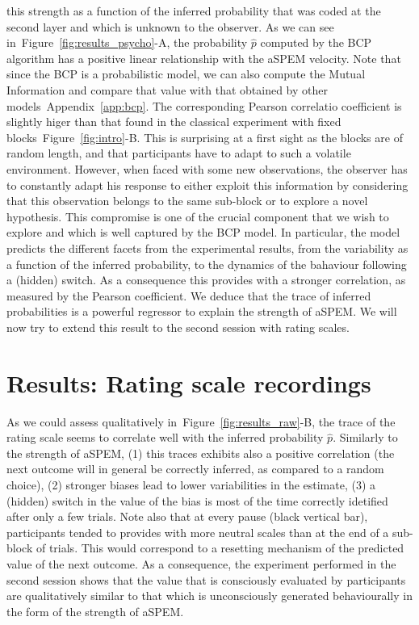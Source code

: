 \documentclass[profile,final,english,draft]{article}%
\newcommand{\seeFig}[1]{Figure~\ref{fig:#1}}
\newcommand{\seeApp}[1]{Appendix~\ref{app:#1}}
\begin{document}
this strength as a function of the inferred probability
that was coded at the second layer and which is unknown to the observer.
As we can see in~\seeFig{results_psycho}-A,
the probability $\hat{p}$ computed by the BCP algorithm
has a positive linear relationship with the aSPEM velocity.
Note that since the BCP is a probabilistic model,
we can also compute the Mutual Information and
compare that value with that obtained by other models~\seeApp{bcp}.
The corresponding Pearson correlatio coefficient
is slightly higer than that found in
the classical experiment with fixed blocks~\seeFig{intro}-B.
This is surprising at a first sight as the blocks are of random length,
and that participants have to adapt to such a volatile environment.
However, when faced with some new observations,
the observer has to constantly adapt his response
to either exploit this information by considering that
this observation belongs to the same sub-block or to explore
a novel hypothesis.
This compromise is one of the crucial component that we wish to explore
and which is well captured by the BCP model.
In particular, the model predicts the different facets
from the experimental results,
from the variability as a function of the inferred probability,
to the dynamics of the bahaviour following a (hidden) switch.
As a consequence this provides with a stronger correlation,
as measured by the Pearson coefficient.
We deduce that the trace of inferred probabilities is a powerful regressor
to explain the strength of aSPEM.
We will now try to extend this result
to the second session with rating scales.
\section{Results: Rating scale recordings}
\label{sec:rating_scale}
As we could assess qualitatively in~\seeFig{results_raw}-B,
the trace of the rating scale seems to correlate well
with the inferred probability $\hat{p}$.
Similarly to the strength of aSPEM,
(1) this traces exhibits also a positive correlation
(the next outcome will in general be correctly inferred,
as compared to a random choice),
(2) stronger biases lead to lower variabilities in the estimate,
(3) a (hidden) switch in the value of the bias is
most of the time correctly idetified after only a few trials.
Note also that at every pause (black vertical bar),
participants tended to provides with more neutral scales
than at the end of a sub-block of trials.
This would correspond to a resetting mechanism
of the predicted value of the next outcome.
As a consequence, the experiment performed in the second session
shows that the value that is consciously evaluated by participants
are qualitatively similar to that which is unconsciously generated behaviourally
in the form of the strength of aSPEM.
\end{document}
